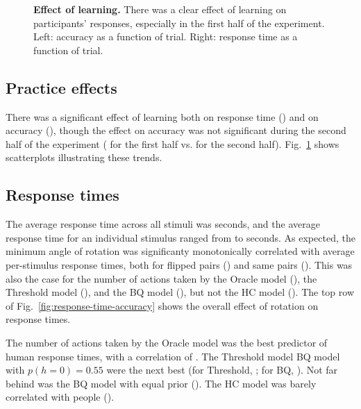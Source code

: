 \documentclass[10pt,letterpaper]{article}
\newcommand{\Oc}[0]{Oracle}
\newcommand{\Th}[0]{Threshold}
\newcommand{\Hc}[0]{HC}
\newcommand{\Bq}[0]{BQ}
\begin{document}
\begin{figure}[t]
  \centering
  \caption{\textbf{Effect of learning.} There was a clear effect of
    learning on participants' responses, especially in the first half
    of the experiment. Left: accuracy as a function of trial. Right:
    response time as a function of trial.}
  \label{fig:learning}
\end{figure}

\subsection{Practice effects} 

There was a significant effect of learning both on response time
(\ExpTrialTimeCorr{}) and on accuracy (\ExpTrialAccuracyCorr{}),
though the effect on accuracy was not significant during the second
half of the experiment (\ExpaTrialAccuracyCorr{} for the first half
vs. \ExpbTrialAccuracyCorr{} for the second
half). Fig.~\ref{fig:learning} shows scatterplots illustrating these
trends.

\subsection{Response times}

The average response time across all stimuli was \ExpTime{} seconds,
and the average response time for an individual stimulus ranged from
\ExpTimeMin{} to \ExpTimeMax{} seconds.  As expected, the minimum
angle of rotation was significanty monotonically correlated with
average per-stimulus response times, both for flipped pairs
(\ExpThetaTimeCorrFlipped{}) and same pairs
(\ExpThetaTimeCorrSame{}). This was also the case for the number of
actions taken by the \Oc{} model (\OcThetaTimeCorr{}), the \Th{} model
(\ThThetaTimeCorr{}), and the \Bq{} model (\BqThetaTimeCorr{}), but
not the \Hc{} model (\HcThetaTimeCorr{}). The top row of
Fig.~\ref{fig:response-time-accuracy} shows the overall effect of
rotation on response times.

The number of actions taken by the \Oc{} model was the best predictor
of human response times, with a correlation of \ExpOcTimeCorr{}. The
\Th{} model \Bq{} model with $p(h=0)=0.55$ were the next best (for
\Th{}, \ExpThTimeCorr{}; for \Bq{}, \ExpBqpTimeCorr{}). Not far behind
was the BQ model with equal prior (\ExpBqTimeCorr{}). The \Hc{} model
was barely correlated with people (\ExpHcTimeCorr{}).
\end{document}
